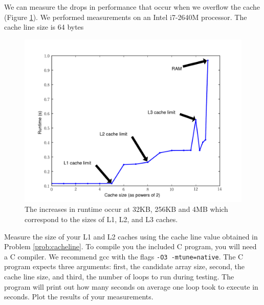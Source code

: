 We can measure the drops in performance that occur when we overflow the cache (Figure \ref{fig:cachesizes}).
We performed measurements on an Intel i7-2640M processor.  The cache line size is 64 bytes

\begin{figure}
\centering
\includegraphics[width=\textwidth]{cache_size.pdf}
\caption{The increases in runtime occur at 32KB, 256KB and 4MB which correspond to the sizes of L1, L2, and L3 caches.}
\label{fig:cachesizes}
\end{figure}


\begin{problem}
Measure the size of your L1 and L2 caches using the cache line value obtained in
Problem \ref{prob:cacheline}.  
To compile you the included C program, you will need a C compiler.
We recommend gcc with the flags \texttt{-O3 -mtune=native}.
The C program expects three arguments: first, the candidate array size, second, the cache line size, and third, the number of loops to run during testing.
The program will print out how many seconds on average one loop took to execute in seconds.
Plot the results of your measurements.
\end{problem}

